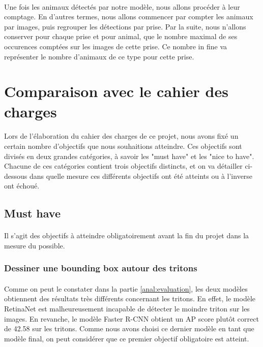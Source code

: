 \paragraph{} Une fois les animaux détectés par notre modèle, nous allons procéder à leur comptage. En d'autres termes, nous allons commencer par compter les animaux par images, puis regrouper les détections par prise. Par la suite, nous n'allons conserver pour chaque prise et pour animal, que le nombre maximal de ses occurences comptées sur les images de cette prise. Ce nombre in fine va représenter le nombre d'animaux de ce type pour cette prise. 

\section{Comparaison avec le cahier des charges}

\paragraph{} Lors de l'élaboration du cahier des charges de ce projet, nous avons fixé un certain nombre d'objectifs que nous souhaitions atteindre. Ces objectifs sont divisés en deux grandes catégories, à savoir les "must have" et les "nice to have". Chacune de ces catégories contient trois objectifs distincts, et on va détailler ci-dessous dans quelle mesure ces différents objectifs ont été atteints ou à l'inverse ont échoué.

\subsection{Must have}
\paragraph{} Il s'agit des objectifs à atteindre obligatoirement avant la fin du projet dans la mesure du possible.

\subsubsection{Dessiner une bounding box autour des tritons}
\paragraph{} Comme on peut le constater dans la partie \ref{anal:evaluation}, les deux modèles obtiennent des résultats très différents concernant les tritons. En effet, le modèle RetinaNet est malheureusement incapable de détecter le moindre triton sur les images. En revanche, le modèle Faster R-CNN obtient un AP score plutôt correct de 42.58 sur les tritons. Comme nous avons choisi ce dernier modèle en tant que modèle final, on peut considérer que ce premier objectif obligatoire est atteint.

